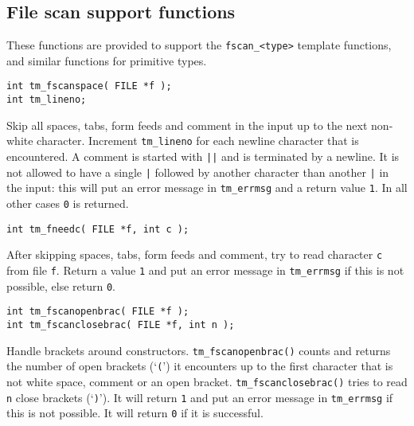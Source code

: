\subsection{File scan support functions}
These functions are provided to support the \verb'fscan_<type>' template
functions, and similar functions for primitive types.
\par
\begin{verbatim}
int tm_fscanspace( FILE *f );
int tm_lineno;
\end{verbatim}
\begin{desc}
Skip all spaces, tabs, form feeds and comment in the input up to the
next non-white character.
Increment \texttt{tm\_lineno} for each newline character that is encountered.
A comment is started with \texttt{||} and is terminated by a newline.
It is not allowed to have a single \texttt{|}
followed by another character than another \texttt{|} in the input:
this will put an error message in \texttt{tm\_errmsg} and a return value \texttt{1}.
In all other cases \texttt{0} is returned.
\end{desc}
\begin{verbatim}
int tm_fneedc( FILE *f, int c );
\end{verbatim}
\begin{desc}
After skipping spaces, tabs, form feeds and comment,
try to read character \texttt{c} from file \texttt{f}.
Return a value \texttt{1} and put an error message in \texttt{tm\_errmsg} if this
is not possible,
else return \texttt{0}.
\end{desc}
\begin{verbatim}
int tm_fscanopenbrac( FILE *f );
int tm_fscanclosebrac( FILE *f, int n );
\end{verbatim}
\begin{desc}
\begin{sloppypar}
Handle brackets around constructors.
\verb+tm_fscanopenbrac()+ counts and returns the number
of open brackets (`\texttt{(}') it encounters up to the first character
that is not white space, comment or an open bracket.
\verb+tm_fscanclosebrac()+ tries to read \texttt{n} close brackets (`\texttt{)}').
It will return \texttt{1} and put an error message in \texttt{tm\_errmsg} if this is
not possible.
It will return \texttt{0} if it is successful.
\end{sloppypar}
\end{desc}
